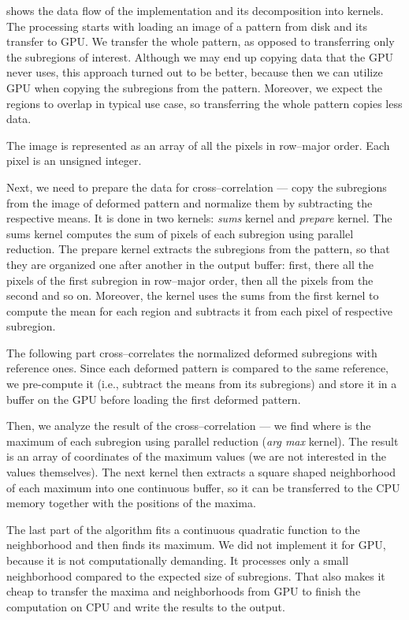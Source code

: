  shows the data flow of the implementation and its decomposition into kernels. The processing starts with loading an image of a pattern from disk and its transfer to GPU. We transfer the whole pattern, as opposed to transferring only the subregions of interest.  Although we may end up copying data that the GPU never uses, this approach turned out to be better, because then we can utilize GPU when copying the subregions from the pattern. Moreover, we expect the regions to overlap in typical use case, so transferring the whole pattern copies less data.

The image is represented as an array of all the pixels in row--major order. Each pixel is an unsigned integer. 

Next, we need to prepare the data for cross--correlation --- copy the subregions from the image of deformed pattern and normalize them by subtracting the respective means. It is done in two kernels: \emph{sums} kernel and \emph{prepare} kernel. The sums kernel computes the sum of pixels of each subregion using parallel reduction. The prepare kernel extracts the subregions from the pattern, so that they are organized one after another in the output buffer: first, there all the pixels of the first subregion in row--major order, then all the pixels from the second and so on. Moreover, the kernel uses the sums from the first kernel to compute the mean for each region and subtracts it from each pixel of respective subregion.

The following part cross--correlates the normalized deformed subregions with reference ones. Since each deformed pattern is compared to the same reference, we pre-compute it (i.e., subtract the means from its subregions) and store it in a buffer on the GPU before loading the first deformed pattern.

Then, we analyze the result of the cross--correlation --- we find where is the maximum of each subregion using parallel reduction (\emph{arg max} kernel). The result is an array of coordinates of the maximum values (we are not interested in the values themselves). The next kernel then extracts a square shaped neighborhood of each maximum into one continuous buffer, so it can be transferred to the CPU memory together with the positions of the maxima.

The last part of the algorithm fits a continuous quadratic function to the neighborhood and then finds its maximum. We did not implement it for GPU, because it is not computationally demanding. It processes only a small neighborhood compared to the expected size of subregions. That also makes it cheap to transfer the maxima and neighborhoods from GPU to finish the computation on CPU and write the results to the output.

